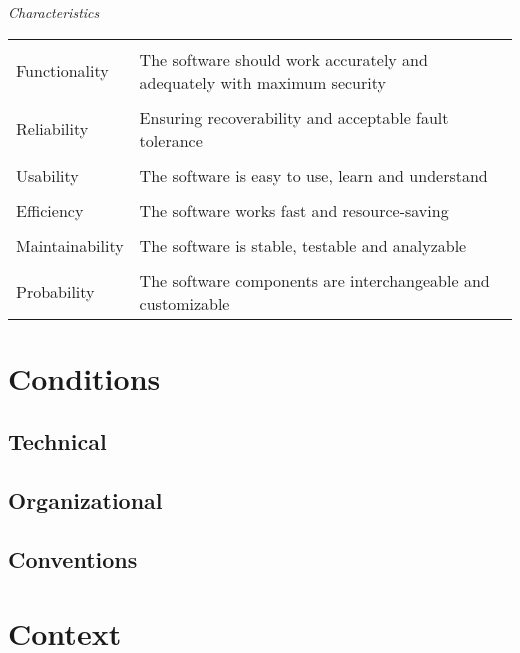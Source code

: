 \documentclass[11pt]{article}
\begin{document}
    \textit{Characteristics}
    \begin{table}[!ht]
        \setlength{\tabcolsep}{10pt}
        \begin{tabular}{l | p{8.8cm}}
            \hline
            \\[0ex] Functionality & The software should work accurately and adequately with maximum security \\[2ex] \hline
            \\[0ex] Reliability & Ensuring recoverability and acceptable fault tolerance \\[2ex] \hline
            \\[0ex] Usability & The software is easy to use, learn and understand \\[2ex] \hline
            \\[0ex] Efficiency & The software works fast and resource-saving \\[2ex] \hline
            \\[0ex] Maintainability & The software is stable, testable and analyzable \\[2ex] \hline
            \\[0ex] Probability & The software components are interchangeable and customizable \\[2ex]
            \hline
        \end{tabular}
    \end{table}

    \section{Conditions}

        \subsection{Technical}
        \subsection{Organizational}
        \subsection{Conventions}

    \section{Context}
\end{document}
